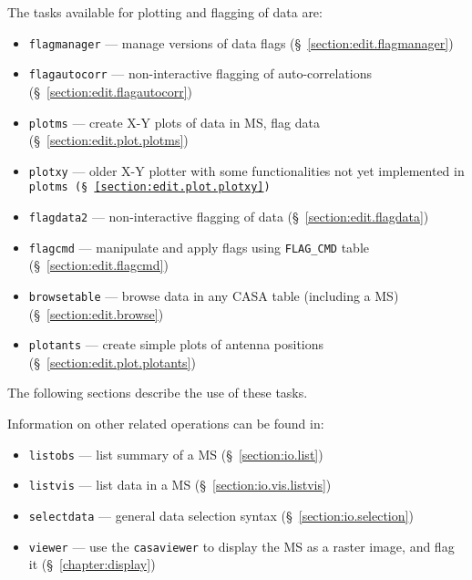 The tasks available for plotting and flagging of data are:
\begin{itemize}
   \item {\tt flagmanager} --- manage versions of data flags
      (\S~\ref{section:edit.flagmanager})
   \item {\tt flagautocorr} --- non-interactive flagging of auto-correlations
      (\S~\ref{section:edit.flagautocorr})
   \item {\tt plotms} --- create X-Y plots of data in MS, flag data
      (\S~\ref{section:edit.plot.plotms})
   \item {\tt plotxy} --- older X-Y plotter with some functionalities not yet implemented in \tt{plotms}
      (\S~\ref{section:edit.plot.plotxy})
   \item {\tt flagdata2} --- non-interactive flagging of data
      (\S~\ref{section:edit.flagdata})
   \item {\tt flagcmd} --- manipulate and apply flags using {\tt FLAG\_CMD} table
      (\S~\ref{section:edit.flagcmd})
   \item {\tt browsetable} --- browse data in any CASA table (including a MS)
      (\S~\ref{section:edit.browse})
   \item {\tt plotants} --- create simple plots of antenna positions
      (\S~\ref{section:edit.plot.plotants})
\end{itemize}

The following sections describe the use of these tasks.

Information on other related operations can be found in:
\begin{itemize}
   \item {\tt listobs} --- list summary of a MS (\S~\ref{section:io.list})
   \item {\tt listvis} --- list data in a MS (\S~\ref{section:io.vis.listvis})
   \item {\tt selectdata} --- general data selection syntax
      (\S~\ref{section:io.selection})
   \item {\tt viewer} --- use the {\tt casaviewer} to display the MS as a 
      raster image, and flag it (\S~\ref{chapter:display})

\end{itemize}

